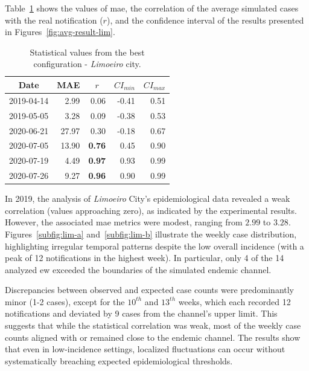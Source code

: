 Table~\ref{tab:statistical-data-lim} shows the values of \gls{mae}, the correlation of the average simulated cases with the real notification ($r$), and the confidence interval of the results presented in Figures~\ref{fig:avg-result-lim}.

\begin{table}[!ht]
	\centering
	\caption{Statistical values from the best configuration - \textit{Limoeiro} city.}
	\label{tab:statistical-data-lim}
	\small{%
		\begin{tabular}{lrrrr}
			\toprule
			\multicolumn{1}{c}{\textbf{Date}}       &
			\multicolumn{1}{c}{\textbf{MAE}}        &
			\multicolumn{1}{c}{\textbf{$r$}}        &
			\multicolumn{1}{c}{\textbf{$CI_{min}$}} &
			\multicolumn{1}{c}{\textbf{$CI_{max}$}}                                        \\ \midrule
			2019-04-14                              & 2.99  & 0.06          & -0.41 & 0.51 \\
			2019-05-05                              & 3.28  & 0.09          & -0.38 & 0.53 \\
			2020-06-21                              & 27.97 & 0.30          & -0.18 & 0.67 \\
			2020-07-05                              & 13.90 & \textbf{0.76} & 0.45  & 0.90 \\
			2020-07-19                              & 4.49  & \textbf{0.97} & 0.93  & 0.99 \\
			2020-07-26                              & 9.27  & \textbf{0.96} & 0.90  & 0.99 \\ \bottomrule
		\end{tabular}%
	}
\end{table}

In 2019, the analysis of \textit{Limoeiro} City’s epidemiological data revealed
a weak correlation (values approaching zero), as indicated by the experimental
results. However, the associated \gls{mae} metrics were modest, ranging from
$2.99$ to $3.28$. Figures~\ref{subfig:lim-a} and~\ref{subfig:lim-b} illustrate
the weekly case distribution, highlighting irregular temporal patterns despite
the low overall incidence (with a peak of 12 notifications in the highest week).
In particular, only 4 of the 14 analyzed \gls{ew} exceeded the boundaries of the
simulated endemic channel.

Discrepancies between observed and expected case counts were predominantly minor
(1-2 cases), except for the $10^{th}$ and $13^{th}$ weeks, which each recorded
12 notifications and deviated by 9 cases from the channel’s upper limit. This
suggests that while the statistical correlation was weak, most of the weekly
case counts aligned with or remained close to the endemic channel. The results
show that even in low-incidence settings, localized fluctuations can occur
without systematically breaching expected epidemiological thresholds.

